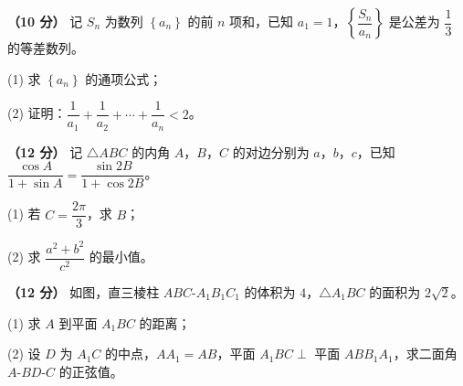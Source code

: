 \begin{question}
\textbf{（10 分）} 记 $S_n$ 为数列 $\left\{a_n\right\}$ 的前 $n$ 项和，已知 $a_1=1$，$\left\{\dfrac{S_n}{a_n}\right\}$ 是公差为 $\dfrac13$ 的等差数列。

  (1) 求 $\left\{a_n\right\}$ 的通项公式；

  (2) 证明：$\dfrac1{a_1}+\dfrac1{a_2}+\cdots+\dfrac1{a_n}<2$。

\end{question}
\begin{question}
\textbf{（12 分）} 记 $\triangle ABC$ 的内角 $A$，$B$，$C$ 的对边分别为 $a$，$b$，$c$，已知 $\dfrac{\cos A}{1+\sin A}=\dfrac{\sin2B}{1+\cos2B}$。

  (1) 若 $C=\dfrac{2\pi}3$，求 $B$；

  (2) 求 $\dfrac{a^{2}+b^{2}}{c^{2}}$ 的最小值。

\Needspace{0.4\textheight}
\end{question}
\begin{question}
\textbf{（12 分）} 如图，直三棱柱 $ABC\text{-}A_1B_1C_1$ 的体积为 $4$，$\triangle A_1BC$ 的面积为 $2\sqrt2$。
\nopagebreak[4]
\begin{center}\end{center}
\nopagebreak[4]
  (1) 求 $A$ 到平面 $A_1BC$ 的距离；

  (2) 设 $D$ 为 $A_1C$ 的中点，$AA_1=AB$，平面 $A_1BC\perp$ 平面 $ABB_1A_1$，求二面角 $A\text{-}BD\text{-}C$ 的正弦值。

\end{question}
